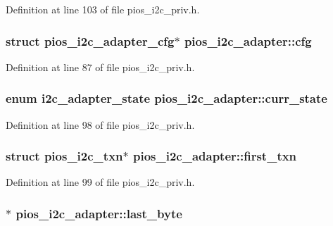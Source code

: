 Definition at line 103 of file pios\-\_\-i2c\-\_\-priv.\-h.

\hypertarget{structpios__i2c__adapter_a99a6a40ff53546cd3f5a316a621be402}{
\subsubsection[{cfg}]{\setlength{\rightskip}{0pt plus 5cm}struct {\bf pios\-\_\-i2c\-\_\-adapter\-\_\-cfg}$\ast$ pios\-\_\-i2c\-\_\-adapter\-::cfg}}\label{structpios__i2c__adapter_a99a6a40ff53546cd3f5a316a621be402}


Definition at line 87 of file pios\-\_\-i2c\-\_\-priv.\-h.

\hypertarget{structpios__i2c__adapter_ac619064c9dc42d3057f2188f188d5ee3}{
\subsubsection[{curr\-\_\-state}]{\setlength{\rightskip}{0pt plus 5cm}enum {\bf i2c\-\_\-adapter\-\_\-state} pios\-\_\-i2c\-\_\-adapter\-::curr\-\_\-state}}\label{structpios__i2c__adapter_ac619064c9dc42d3057f2188f188d5ee3}


Definition at line 98 of file pios\-\_\-i2c\-\_\-priv.\-h.

\hypertarget{structpios__i2c__adapter_ad98b03cc641fe33909c19a8e96cb64d5}{
\subsubsection[{first\-\_\-txn}]{\setlength{\rightskip}{0pt plus 5cm}struct {\bf pios\-\_\-i2c\-\_\-txn}$\ast$ pios\-\_\-i2c\-\_\-adapter\-::first\-\_\-txn}}\label{structpios__i2c__adapter_ad98b03cc641fe33909c19a8e96cb64d5}


Definition at line 99 of file pios\-\_\-i2c\-\_\-priv.\-h.

\hypertarget{structpios__i2c__adapter_a09797c133013f2126da829410d1df0c0}{
\subsubsection[{last\-\_\-byte}]{$\ast$ pios\-\_\-i2c\-\_\-adapter\-::last\-\_\-byte}}\label{structpios__i2c__adapter_a09797c133013f2126da829410d1df0c0}


